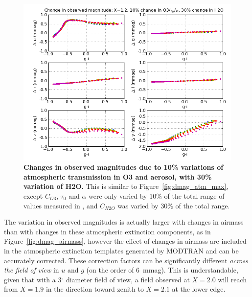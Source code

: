 \documentclass[12pt,preprint]{aastex}
\begin{document}
\begin{figure}
\centering
\includegraphics[width=6in]{delta_mags_10}
\caption{{\small
{\bf Changes in observed magnitudes due to 10\% variations of 
atmospheric transmission in O3 and aerosol, with 30\% variation of H2O.} 
This is similar to Figure~\ref{fig:dmag_atm_max}, except $C_{O3}$,
$\tau_0$ and $\alpha$ were only varied by 10\% of the total range of
values measured in \citet{Burke2010b}, and $C_{H2O}$ was varied by 30\%
of the total range. }}
\label{fig:dmag_atm_10}
\end{figure}

The variation in observed magnitudes is actually larger with changes
in airmass than with changes in these atmospheric extinction
components, as in Figure~\ref{fig:dmag_airmass}, however the effect of
changes in airmass are included in the atmospheric extinction
templates generated by MODTRAN and can be accurately corrected.  These
correction factors can be significantly different {\it across the
field of view} in $u$ and $g$ (on the order of 6~mmag). This is
understandable, given that with a 3$^{\circ}$ diameter field of view,
a field observed at $X=2.0$ will reach from $X=1.9$ in the direction
toward zenith to $X=2.1$ at the lower edge. 
\end{document}
